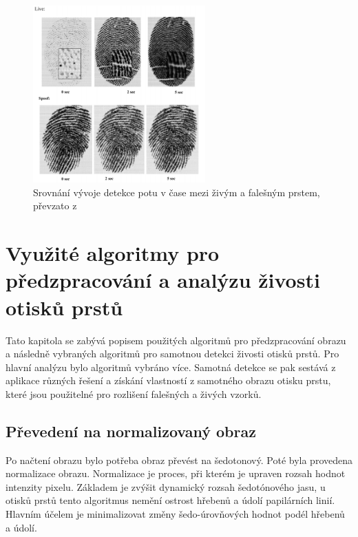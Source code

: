 \begin{figure}[!htbp]
    \centering
    \includegraphics[width=250px]{obrazky-figures/pores.png}
    \caption{Srovnání vývoje detekce potu v čase mezi živým a falešným prstem, převzato z \cite{PoresResearch}}
\end{figure}




\chapter{Využité algoritmy pro předzpracování a analýzu živosti otisků prstů}
Tato kapitola se zabývá popisem použitých algoritmů pro předzpracování obrazu a následně vybraných algoritmů pro samotnou detekci živosti otisků prstů. Pro hlavní analýzu bylo algoritmů vybráno více. Samotná detekce se pak sestává z aplikace různých řešení a získání vlastností z samotného obrazu otisku prstu, které jsou použitelné pro rozlišení falešných a živých vzorků.
\section{Převedení na normalizovaný obraz}
Po načtení obrazu bylo potřeba obraz převést na šedotonový. Poté byla provedena normalizace obrazu. Normalizace je proces, při kterém je upraven rozsah hodnot intenzity pixelu. Základem je zvýšit dynamický rozsah šedotónového jasu, u otisků prstů tento algoritmus nemění ostrost hřebenů a údolí papilárních linií. Hlavním účelem je minimalizovat změny šedo-úrovňových hodnot podél hřebenů a údolí. 

